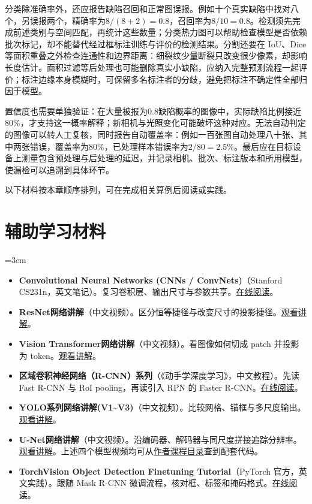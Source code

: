 分类除准确率外，还应报告缺陷召回和正常图误报。例如十个真实缺陷中找对八个，另误报两个，精确率为$8/(8+2)=0.8$，召回率为$8/10=0.8$。检测须先完成前述类别与空间匹配，再统计这些数量；分类热力图可以帮助检查模型是否依赖批次标记，却不能替代经过框标注训练与评价的检测结果。分割还要在 IoU、Dice 等面积重叠之外检查连通性和边界距离：细裂纹少量断裂只改变很少像素，却影响长度估计。面积过滤等后处理也可能删除真实小缺陷，应纳入完整预测流程一起评价；标注边缘本身模糊时，可保留多名标注者的分歧，避免把标注不确定性全部归因于模型。

置信度也需要单独验证：在大量被报为$0.8$缺陷概率的图像中，实际缺陷比例接近$80\%$，才支持这一概率解释；新相机与光照变化可能破坏这种对应。无法自动判定的图像可以转人工复核，同时报告自动覆盖率：例如一百张图自动处理八十张、其中两张错误，覆盖率为$80\%$，已处理样本错误率为$2/80=2.5\%$。最后应在目标设备上测量包含预处理与后处理的延迟，并记录相机、批次、标注版本和所用模型，使漏检可以追溯到具体环节。

以下材料按本章顺序排列，可在完成相关算例后阅读或实践。
\section*{辅助学习材料}
\begingroup
\emergencystretch=3em
\begin{itemize}
\item \textbf{Convolutional Neural Networks (CNNs / ConvNets)}（Stanford CS231n，英文笔记）。复习卷积层、输出尺寸与参数共享。\href{https://cs231n.github.io/convolutional-networks/}{在线阅读}。
\item \textbf{ResNet网络讲解}（中文视频）。区分恒等捷径与改变尺寸的投影捷径。\href{https://www.bilibili.com/video/BV1T7411T7wa}{观看讲解}。
\item \textbf{Vision Transformer网络讲解}（中文视频）。看图像如何切成 patch 并投影为 token。\href{https://www.bilibili.com/video/BV1Jh411Y7WQ}{观看讲解}。
\item \textbf{区域卷积神经网络（R-CNN）系列}（《动手学深度学习》，中文教程）。先读 Fast R-CNN 与 RoI pooling，再读引入 RPN 的 Faster R-CNN。\href{https://zh.d2l.ai/chapter\_computer-vision/rcnn.html}{在线阅读}。
\item \textbf{YOLO系列网络讲解(V1\textasciitilde V3)}（中文视频）。比较网格、锚框与多尺度输出。\href{https://www.bilibili.com/video/BV1yi4y1g7ro}{观看讲解}。
\item \textbf{U-Net网络讲解}（中文视频）。沿编码器、解码器与同尺度拼接追踪分辨率。\href{https://www.bilibili.com/video/BV1Vq4y127fB/}{观看讲解}。上述四个模型视频均可从\href{https://github.com/WZMIAOMIAO/deep-learning-for-image-processing}{作者课程目录}查到配套代码。
\item \textbf{TorchVision Object Detection Finetuning Tutorial}（PyTorch 官方，英文实践）。跟随 Mask R-CNN 微调流程，核对框、标签和掩码格式。\href{https://docs.pytorch.org/tutorials/intermediate/torchvision\_tutorial.html}{在线阅读}。
\end{itemize}
\endgroup
